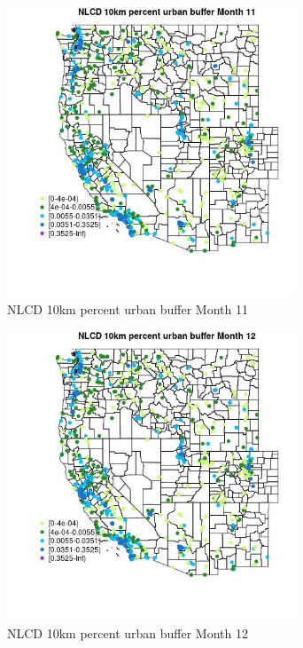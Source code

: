 \begin{figure} 
\centering  
\includegraphics[width=0.77\textwidth]{Code_Outputs/Report_ML_input_PM25_Step4_part_e_de_duplicated_aves_compiled_2019-05-21wNAs_MapObsMo11NLCD_10km_percent_urban_buffer.jpg} 
\caption{\label{fig:Report_ML_input_PM25_Step4_part_e_de_duplicated_aves_compiled_2019-05-21wNAsMapObsMo11NLCD_10km_percent_urban_buffer}NLCD 10km percent urban buffer Month 11} 
\end{figure} 
 

\clearpage 

\begin{figure} 
\centering  
\includegraphics[width=0.77\textwidth]{Code_Outputs/Report_ML_input_PM25_Step4_part_e_de_duplicated_aves_compiled_2019-05-21wNAs_MapObsMo12NLCD_10km_percent_urban_buffer.jpg} 
\caption{\label{fig:Report_ML_input_PM25_Step4_part_e_de_duplicated_aves_compiled_2019-05-21wNAsMapObsMo12NLCD_10km_percent_urban_buffer}NLCD 10km percent urban buffer Month 12} 
\end{figure} 
 

